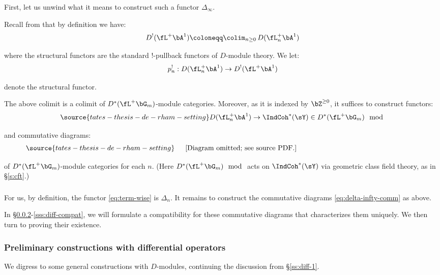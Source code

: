 First, let us unwind what it means to construct such a functor
$\Delta_{\infty}$.

Recall from \cite{dmod} that by definition we have:
%
\[
D^!(\fL^+\bA^1) \coloneqq \colim_{n \geq 0} \, D(\fL_n^+\bA^1)
\]

 where the structural functors are the standard
$!$-pullback functors of $D$-module theory. We let:
%
\[
p_n^!: D(\fL_n^+\bA^1) \to
D^!(\fL^+\bA^1)
\]

 denote the structural functor.

The above colimit is a colimit of $D^*(\fL^+\bG_m)$-module categories.
Moreover, as it is indexed by $\bZ^{\geq 0}$, it suffices to
construct functors:
%
\begin{equation}\label{eq:term-wise}
\source{tates-thesis-de-rham-setting}
D(\fL_n^+\bA^1) \to \IndCoh^*(\sY) \in
D^*(\fL^+\bG_m)\mod
\end{equation}

 and commutative diagrams:
%
\begin{equation}\label{eq:delta-infty-comm}
\source{tates-thesis-de-rham-setting}
\vcenter{\text{[Diagram omitted; see source PDF.]}}
\end{equation}

 of $D^*(\fL^+\bG_m)$-module categories for each $n$.
(Here $D^*(\fL^+\bG_m)\mod $ acts on $\IndCoh^*(\sY)$ via
geometric class field theory, as in \S \ref{s:cft}.)

\subsubsection{}

For us, by definition, the functor \eqref{eq:term-wise}
is $\Delta_n$. It remains to construct the commutative
diagrams \eqref{eq:delta-infty-comm} as above.

In \S \ref{sss:diff-func}-\ref{sss:diff-compat}, we will formulate
a compatibility for these commutative diagrams that
characterizes them uniquely. We then turn to proving their existence.

\subsubsection{Preliminary constructions with differential operators}\label{sss:diff-func}

We digress to some general constructions with $D$-modules, continuing
the discussion from \S \ref{ss:diff-1}.

